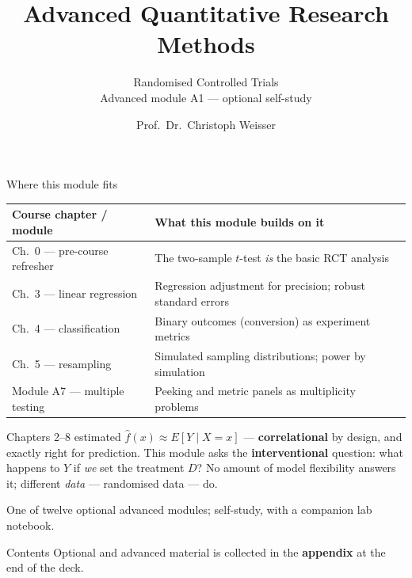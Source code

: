 \documentclass[aspectratio=169,11pt]{beamer}
\title{Advanced Quantitative Research Methods}
\subtitle{Randomised Controlled Trials\\[2pt]{\small Advanced module A1 --- optional self-study}}
\author{Prof.\ Dr.\ Christoph Weisser}
\date{}\graphicspath{{images/}}
\begin{document}
\begin{frame}[plain]\titlepage\end{frame}

\begin{frame}{Where this module fits}
  \footnotesize
  \begin{center}
  \begin{tabular}{@{}p{3.6cm}p{8.6cm}@{}}
    \toprule
    \textbf{Course chapter / module} & \textbf{What this module builds on it} \\
    \midrule
    Ch.\ 0 --- pre-course refresher & The two-sample $t$-test \emph{is} the basic RCT analysis \\
    Ch.\ 3 --- linear regression & Regression adjustment for precision; robust standard errors \\
    Ch.\ 4 --- classification & Binary outcomes (conversion) as experiment metrics \\
    Ch.\ 5 --- resampling & Simulated sampling distributions; power by simulation \\
    Module A7 --- multiple testing & Peeking and metric panels as multiplicity problems \\
    \bottomrule
  \end{tabular}
  \end{center}
  \vspace{2pt}
  \begin{takeaway}
    Chapters 2--8 estimated $\hat f(x)\approx E[Y\mid X=x]$ --- \textbf{correlational} by
    design, and exactly right for prediction. This module asks the \textbf{interventional}
    question: what happens to $Y$ if \emph{we} set the treatment $D$? No amount of model
    flexibility answers it; different \emph{data} --- randomised data --- do.
  \end{takeaway}
  {\scriptsize One of twelve optional advanced modules; self-study, with a companion lab notebook.}
\end{frame}

\begin{frame}{Contents}\small\tableofcontents[hideallsubsections]
  \vfill
  {\tiny Optional and advanced material is collected in the \textbf{appendix} at the end of the deck.}
\end{frame}
\end{document}
